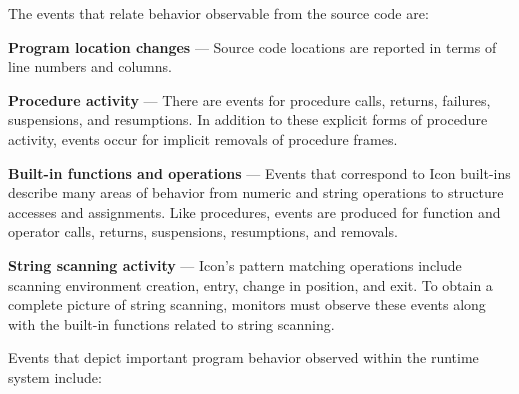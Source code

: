 \vspace{0.25pc}
\noindent
The events that relate behavior observable from the source code are:

\begin{list}{}{\itemsep 7pt} %
\item [{\bf Program location changes}] --- Source code locations are
	reported in terms of line numbers and columns.
\item [{\bf Procedure activity}] --- There are events for procedure calls,
	returns, failures, suspensions,
	and resumptions.  In addition to these explicit forms of
	procedure activity, events occur for implicit removals of
	procedure frames.
\item [{\bf Built-in functions and operations}] --- Events that correspond
	to Icon built-ins describe many areas of behavior from numeric and
	string operations to structure accesses	and assignments.
	Like procedures, events are produced for function and operator calls,
	returns, suspensions, resumptions, and removals.
\item [{\bf String scanning activity}] --- Icon's pattern matching
	operations include scanning environment
	creation, entry, change in position, and exit.  To obtain
	a complete picture of string scanning, monitors must
	observe these events along with the built-in functions
	related to string scanning.
\end{list}

\vspace{1pc}


\vspace{0.25pc}
\noindent
Events that depict important program behavior observed within the runtime
system include:

